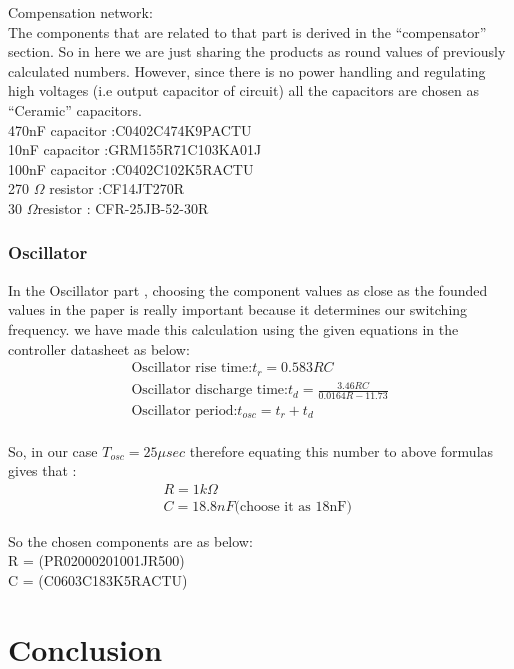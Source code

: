 \documentclass{article}
\begin{document}
Compensation network: \\The components that are related to that part is derived in the “compensator” section. So in here we are just sharing the products as round values of previously calculated numbers. However, since there is no power handling and regulating high voltages (i.e output capacitor of circuit) all the capacitors are chosen as “Ceramic” capacitors.\\470nF capacitor :C0402C474K9PACTU\\
10nF capacitor   :GRM155R71C103KA01J\\
100nF capacitor  :C0402C102K5RACTU\\
270 $\Omega$ resistor  :CF14JT270R\\
30 $\Omega$resistor :  CFR-25JB-52-30R\\

\subsubsection{Oscillator}

In the Oscillator part , choosing the component values as close as the founded values in the paper is really important because it determines our switching frequency. we have made this calculation using the given equations in the controller datasheet as below:
\begin{gather*}
    \text{Oscillator rise time:} t_r=0.583RC\\
    \text{Oscillator discharge time:} t_d=\frac{3.46RC}{0.0164R-11.73}\\
    \text{Oscillator period:}t_{osc}=t_r+t_d\\
\end{gather*}

So, in our case $T_{osc}=25 \mu sec$ therefore equating this number to above formulas gives that :\\
\begin{gather*}
   R=1k\Omega\\
C=18.8 nF \text{(choose it as 18nF) }
\end{gather*}


So the chosen components are as below:\\

R = (PR02000201001JR500)\\
C = (C0603C183K5RACTU) 

\section{Conclusion}
\end{document}
